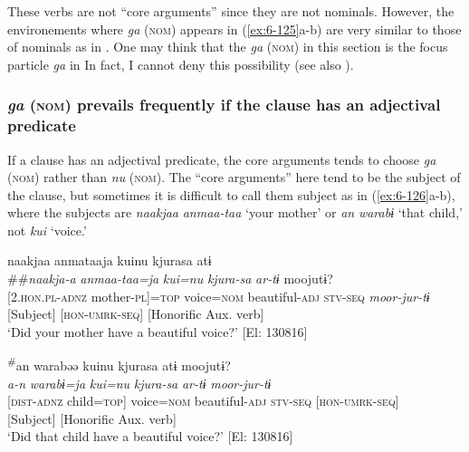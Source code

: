 \begin{styleBeschriftung}
These verbs are not “core arguments” since they are not nominals. However, the environements where \textit{ga} (\textsc{nom}) appears in (\ref{ex:6-125}a-b) are very similar to those of nominals as in . One may think that the \textit{ga} (\textsc{nom}) in this section is the focus particle \textit{ga} in  In fact, I cannot deny this possibility (see also ).

\subsubsection{\textit{ga} (\textsc{nom}) prevails frequently if the clause has an adjectival predicate}

If a clause has an adjectival predicate, the core arguments tends to choose \textit{ga} (\textsc{nom}) rather than \textit{nu} (\textsc{nom}). The “core arguments” here tend to be the subject of the clause, but sometimes it is difficult to call them subject as in (\ref{ex:6-126}a-b), where the subjects are \textit{naakjaa} \textit{anmaa-taa} ‘your mother’ or \textit{an} \textit{warabɨ} ‘that child,’ not \textit{kui} ‘voice.’

\ea\label{ex:6-126}
\ea
{\TM}
\gll naakjaa  anmataaja  kuinu  kjurasa  atɨ\\##\textit{naakja-a}  \textit{anmaa-taa=ja}  \textit{kui=nu}  \textit{kjura-sa}  \textit{ar-tɨ}    moojutɨ?\\
      {}[2.\textsc{hon}.\textsc{pl}-\textsc{adnz}  mother-\textsc{pl}]=\textsc{top}  voice=\textsc{nom}  beautiful-\textsc{adj}  \textsc{stv}-\textsc{seq}    \textit{moor-jur-tɨ}\\
      {}[Subject]            [\textsc{hon}-\textsc{umrk}-\textsc{seq}]      [Honorific Aux. verb]\\
\glt ‘Did your mother have a beautiful voice?’ [El: 130816]

\ex
{\TM}
\gll \textsuperscript{\#}an  warabəə  kuinu  kjurasa  atɨ   moojutɨ?\\
       \textit{a-n}  \textit{warabɨ=ja}  \textit{kui=nu}  \textit{kjura-sa}  \textit{ar-tɨ}    \textit{moor-jur-tɨ}\\
       {}[\textsc{dist}-\textsc{adnz}  child=\textsc{top}]  voice=\textsc{nom}  beautiful-\textsc{adj}  \textsc{stv}-\textsc{seq}     [\textsc{hon}-\textsc{umrk}-\textsc{seq}]\\
       {}[Subject]            [Honorific Aux. verb]\\
 ‘Did that child have a beautiful voice?’ [El: 130816]
\z
\z



\end{styleBeschriftung}
